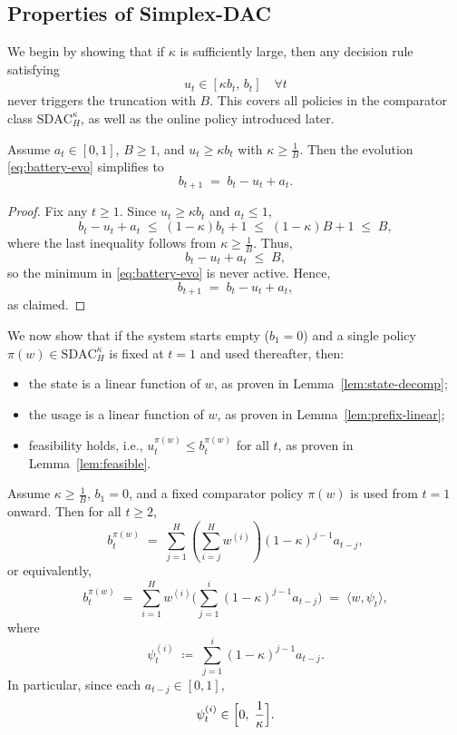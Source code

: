 \subsection{Properties of Simplex-DAC}

We begin by showing that if \(\kappa\) is sufficiently large, then any decision rule satisfying
\[
u_t \in [\kappa b_t,\, b_t] \quad \forall t
\]
never triggers the truncation with \(B\).  
This covers all policies in the comparator class \(\mathrm{SDAC}_H^\kappa\), as well as the online policy introduced later.

\begin{Thm:Lemma}
\label{lem:no-sat}
Assume \(a_t \in [0,1]\), \(B \ge 1\), and \(u_t \ge \kappa b_t\) with \(\kappa \geq \tfrac{1}{B}\).  
Then the evolution \eqref{eq:battery-evo} simplifies to
\[
b_{t+1} \;=\; b_t - u_t + a_t.
\]
\end{Thm:Lemma}

\begin{proof}
Fix any \(t \ge 1\). Since \(u_t \ge \kappa b_t\) and \(a_t \le 1\),
\[
b_t - u_t + a_t
\;\le\; (1-\kappa)b_t + 1
\;\le\; (1-\kappa)B + 1
\;\le\; B,
\]
where the last inequality follows from \(\kappa \ge \tfrac{1}{B}\).  
Thus,
\[
b_t - u_t + a_t \;\le\; B,
\]
so the minimum in \eqref{eq:battery-evo} is never active. Hence,
\[
b_{t+1} \;=\; b_t - u_t + a_t,
\]
as claimed.
\end{proof}




We now show that if the system starts empty (\(b_1=0\)) and a single policy \(\pi(w)\in\mathrm{SDAC}_H^\kappa\) is fixed at \(t=1\) and used thereafter, then:
\begin{itemize}
    \item the state is a linear function of \(w\), as proven in Lemma~\ref{lem:state-decomp};
    \item the usage is a linear function of \(w\), as proven in Lemma~\ref{lem:prefix-linear};
    \item feasibility holds, i.e., \(u_t^{\pi(w)} \le b_t^{\pi(w)}\) for all \(t\), as proven in Lemma~\ref{lem:feasible}.
\end{itemize}


\begin{Thm:Lemma}
\label{lem:state-decomp}
Assume \(\kappa \ge \tfrac{1}{B}\), \(b_1=0\), and a fixed comparator policy \(\pi(w)\) is used from \(t=1\) onward. Then for all \(t \ge 2\),
\[
b_t^{\pi(w)}
\;=\;
\sum_{j=1}^{H} \left(\sum_{i=j}^H w^{(i)}\right) (1-\kappa)^{j-1} a_{t-j},
\]
or equivalently,
\[
b_t^{\pi(w)}
\;=\;
\sum_{i=1}^H w^{(i)} \Biggl(\sum_{j=1}^{i} (1-\kappa)^{j-1} a_{t-j}\Biggr)
\;=\;
\langle w , \psi_t\rangle ,
\]
where
\[
\psi_t^{(i)}
\;\coloneqq\;
\sum_{j=1}^{i} (1-\kappa)^{j-1} a_{t-j}.
\]
In particular, since each \(a_{t-j}\in[0,1]\),
\[
\psi_t^{(i)} \in \Bigl[0,\;\frac{1}{\kappa}\Bigr].
\]
\end{Thm:Lemma}

